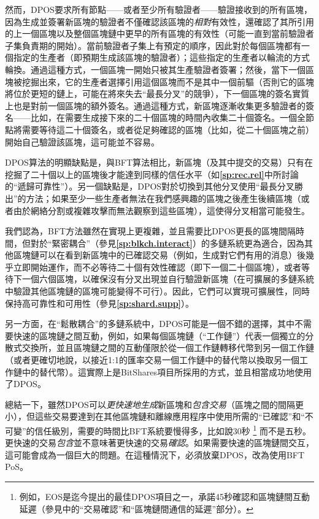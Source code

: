 \documentclass[12pt,oneside]{article}
\def\refpoint#1{{\rm\textbf{\ref{#1}}}}
\let\ptref=\refpoint
\begin{document}
然而，DPOS要求所有節點——或者至少所有驗證者——驗證接收到的所有區塊，因為生成並簽署新區塊的驗證者不僅確認該區塊的{\em 相對}有效性，還確認了其所引用的上一個區塊以及整個區塊鏈中更早的所有區塊的有效性（可能一直到當前驗證者子集負責期的開始）。當前驗證者子集上有預定的順序，因此對於每個區塊都有一個指定的生產者（即預期生成該區塊的驗證者）；這些指定的生產者以輪流的方式輪換。通過這種方式，一個區塊一開始只被其生產驗證者簽署；然後，當下一個區塊被挖掘出來，它的生產者選擇引用這個區塊而不是其中一個前驅（否則它的區塊將位於更短的鏈上，可能在將來失去“最長分叉”的競爭），下一個區塊的簽名實質上也是對前一個區塊的額外簽名。通過這種方式，新區塊逐漸收集更多驗證者的簽名——比如，在需要生成接下來的二十個區塊的時間內收集二十個簽名。一個全節點將需要等待這二十個簽名，或者從足夠確認的區塊（比如，從二十個區塊之前）開始自己驗證該區塊，這可能並不容易。

DPOS算法的明顯缺點是，與BFT算法相比，新區塊（及其中提交的交易）只有在挖掘了二十個以上的區塊後才能達到同樣的信任水平（如\ptref{sp:rec.rel}中所討論的“遞歸可靠性”）。另一個缺點是，DPOS對於切換到其他分叉使用“最長分叉勝出”的方法；如果至少一些生產者無法在我們感興趣的區塊之後產生後續區塊（或者由於網絡分割或複雜攻擊而無法觀察到這些區塊），這使得分叉相當可能發生。

我們認為，BFT方法雖然在實現上更複雜，並且需要比DPOS更長的區塊間隔時間，但對於“緊密耦合”（參見\ptref{sp:blkch.interact}）的多鏈系統更為適合，因為其他區塊鏈可以在看到新區塊中的已確認交易（例如，生成對它們有用的消息）後幾乎立即開始運作，而不必等待二十個有效性確認（即下一個二十個區塊），或者等待下一個六個區塊，以確保沒有分叉出現並自行驗證新區塊（在可擴展的多鏈系統中驗證其他區塊鏈的區塊可能變得不可行）。因此，它們可以實現可擴展性，同時保持高可靠性和可用性（參見\ptref{sp:shard.supp}）。

另一方面，在“鬆散耦合”的多鏈系統中，DPOS可能是一個不錯的選擇，其中不需要快速的區塊鏈之間互動，例如，如果每個區塊鏈（“工作鏈”）代表一個獨立的分散式交換所，並且區塊鏈之間的互動僅限於從一個工作鏈轉移代幣到另一個工作鏈（或者更確切地說，以接近1:1的匯率交易一個工作鏈中的替代幣以換取另一個工作鏈中的替代幣）。這實際上是BitShares項目所採用的方式，並且相當成功地使用了DPOS。

總結一下，雖然DPOS可以{\em 更快速地生成}新區塊和{\em 包含交易}（區塊之間的間隔更小），但這些交易要達到在其他區塊鏈和離線應用程序中使用所需的“已確認”和“不可變”的信任級別，需要的時間比BFT系統要慢得多，比如說30秒%
\footnote{例如，EOS是迄今提出的最佳DPOS項目之一，承諾45秒確認和區塊鏈間互動延遲（參見\cite{EOSWP}中的“交易確認”和“區塊鏈間通信的延遲”部分）。}
而不是五秒。更快速的交易{\em 包含}並不意味著更快速的交易{\em 確認}。如果需要快速的區塊鏈間交互，這可能會成為一個巨大的問題。在這種情況下，必須放棄DPOS，改為使用BFT PoS。
\end{document}
